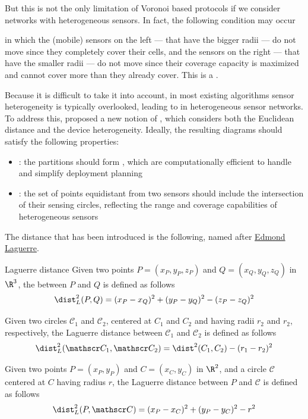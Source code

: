 \documentclass[a4paper, 12pt]{report}
\begin{document}
    But this is not the only limitation of Voronoi based protocols if we consider networks with heterogeneous sensors. In fact, the following condition may occur 


    in which the (mobile) sensors on the left --- that have the bigger radii --- do not move since they completely cover their cells, and the sensors on the right --- that have the smaller radii --- do not move since their coverage capacity is maximized and cannot cover more than they already cover. This is a .

    Because it is difficult to take it into account, in most existing algorithms sensor heterogeneity is typically overlooked, leading to  in heterogeneous sensor networks. To address this, \textcite{blaschke} proposed a new notion of , which considers both the Euclidean distance and the device heterogeneity. Ideally, the resulting diagrams should satisfy the following properties:

    \begin{itemize}
        \item {}: the partitions should form , which are computationally efficient to handle and simplify deployment planning
        \item {}: the set of points equidistant from two sensors should include the intersection of their sensing circles, reflecting the range and coverage capabilities of heterogeneous sensors
    \end{itemize}

    The distance that has been introduced is the following, named after \href{https://en.wikipedia.org/wiki/Edmond_Laguerre}{Edmond Laguerre}.

    \begin{frameddefn}{Laguerre distance}
        Given two points $P=(x_P, y_P, z_P)$ and $Q=(x_Q, y_Q, z_Q)$ in $\R^3$, the  between $P$ and $Q$ is defined as follows $$\dist_L^2(P, Q) = (x_P - x_Q) ^2 + (y_P - y_Q)^2 - (z_P - z_Q)^2$$

        Given two circles $\mathscr C_1$ and $\mathscr C_2$, centered at $C_1$ and $C_2$ and having radii $r_2$ and $r_2$, respectively, the Laguerre distance between $\mathscr C_1$ and $\mathscr C_2$ is defined as follows $$\dist_L^2(\mathscr C_1, \mathscr C_2) = \dist^2(C_1, C_2) - (r_1 - r_2)^2$$

        Given two points $P = (x_P, y_P)$ and $C = (x_C, y_C)$ in $\R^2$, and a circle $\mathscr C$ centered at $C$ having radius $r$, the Laguerre distance between $P$ and $\mathscr C$ is defined as follows $$\dist_L^2(P, \mathscr C) = (x_P - x_C)^2 + (y_P - y_C)^2 - r^2$$
    \end{frameddefn}
\end{document}
